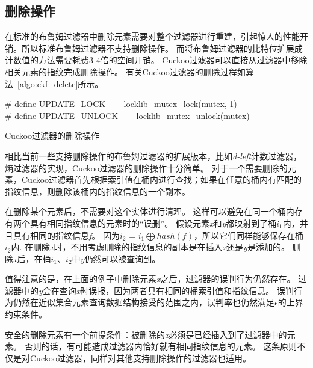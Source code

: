 \subsection{删除操作}
在标准的布鲁姆过滤器中删除元素需要对整个过滤器进行重建，引起惊人的性能开销。所以标准布鲁姆过滤器不支持删除操作。
而将布鲁姆过滤器的比特位扩展成计数值的方法需要耗费3-4倍的空间开销。
Cuckoo过滤器可以直接从过滤器中移除相关元素的指纹完成删除操作。
有关Cuckoo过滤器的删除过程如算法~\ref{algo:ckf_delete}所示。
\begin{algorithm}[htbp]
\SetAlgoLined
\# define UPDATE\_LOCK ~~~ locklib\_mutex\_lock(mutex, 1)\\
\# define UPDATE\_UNLOCK ~~~ locklib\_mutex\_unlock(mutex)\\
\caption{Cuckoo过滤器的删除操作}
\label{algo:ckf_delete}
\end{algorithm}

相比当前一些支持删除操作的布鲁姆过滤器的扩展版本，比如\textit{d-left}计数过滤器，熵过滤器的实现，Cuckoo过滤器的删除操作十分简单。
对于一个需要删除的元素，Cuckoo过滤器首先根据索引值在桶内进行查找；如果在任意的桶内有匹配的指纹信息，则删除该桶内的指纹信息的一个副本。

在删除某个元素后，不需要对这个实体进行清理。
这样可以避免在同一个桶内存有两个具有相同指纹信息的元素时的“误删”。
假设元素\textit{x}和\textit{y}都映射到了桶$i_1$内，并且具有相同的指纹信息\textit{f}。
因为$i_2$ = $i_1\bigoplus hash(f)$，所以它们同样能够保存在桶$i_2$内.
在删除\textit{x}时，不用考虑删除的指纹信息的副本是在插入\textit{x}还是\textit{y}是添加的。
删除\textit{x}后，在桶$i_1$、$i_2$中\textit{y}仍然可以被查询到。

值得注意的是，在上面的例子中删除元素\textit{x}之后，过滤器的误判行为仍然存在。
过滤器中的\textit{y}会在查询\textit{x}时误报，因为两者具有相同的桶索引值和指纹信息。
误判行为仍然在近似集合元素查询数据结构接受的范围之内，误判率也仍然满足$\epsilon$的上界约束条件。

安全的删除元素有一个前提条件：被删除的\textit{x}必须是已经插入到了过滤器中的元素。
否则的话，有可能造成过滤器内恰好就有相同指纹信息的元素。
这条原则不仅是对Cuckoo过滤器，同样对其他支持删除操作的过滤器也适用。

